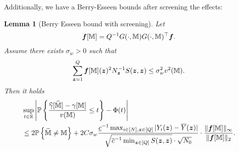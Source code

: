 \documentclass[12pt]{article}
\newtheorem{lemma}{Lemma}
\begin{document}
Additionally, we have a Berry-Esseen bounds after screening the effects:

\begin{lemma}[Berry Esseen bound with  screening]\label{lem:tail-perfect-ms} Let 
\begin{align}\label{eqn:tw}
{{\boldsymbol{f}}}[{\mathbb{M}}] = Q^{-1}G(\cdot,{\mathbb{M}})G(\cdot,{\mathbb{M}})^\top{\boldsymbol{f}}.
\end{align}
Assume there exists $\sigma_w>0$ such that
\begin{align}\label{eqn:nondegenerate-var-tw}
    \sum_{{\boldsymbol{z}}=1}^Q {{\boldsymbol{f}}}[{\mathbb{M}}]({\boldsymbol{z}})^2 N_{{\boldsymbol{z}}}^{-1} S({\boldsymbol{z}},{\boldsymbol{z}}) \le \sigma_w^2 v^2({\mathbb{M}}).
\end{align}
Then it holds
\begin{align}\label{eqn:tail-perfect-ms}
    &\sup_{t\in{\mathbb{R}}}\left|{{\mathbb{P}}\left\{\frac{{\widehat{\gamma}}[\widehat{{\mathbb{M}}}]-\gamma[{\mathbb{M}}]}{v({\mathbb{M}})} \le t\right\}} - \Phi(t)\right| \notag\\
    &\le 2{{\mathbb{P}}\left\{\widehat{{\mathbb{M}}}\neq {\mathbb{M}}\right\}} +  2C\sigma_w   \frac{\underline{c}^{-1} \max_{i\in[N],{\boldsymbol{z}}\in[Q]}|Y_i({\boldsymbol{z}})-\overline{Y}({\boldsymbol{z}})|}{\sqrt{\overline{c}^{-1} \min_{{\boldsymbol{z}}\in[Q]} S({\boldsymbol{z}},{\boldsymbol{z}})}\cdot \sqrt{N_0}}\cdot  \frac{\|{{\boldsymbol{f}}}[{\mathbb{M}}]\|_\infty}{\|{{\boldsymbol{f}}}[{\mathbb{M}}]\|_2} .
\end{align}
\end{lemma}
\end{document}
